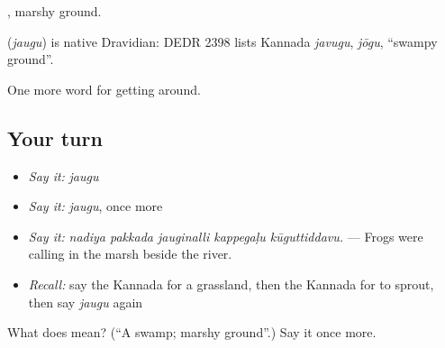  , marshy ground.

\begin{cousinweb}
\textbf{} (\emph{jaugu}) is native Dravidian: DEDR 2398 lists Kannada \emph{javugu}, \emph{jōgu}, \textquotedblleft{}swampy ground\textquotedblright{}.
\end{cousinweb}

\begin{grammarlens}[title={What you've built}]
One more word for getting around.
\end{grammarlens}

\subsection*{Your turn}
\begin{itemize}
\raggedright
  \item \emph{Say it:} \emph{jaugu}
  \item \emph{Say it:} \emph{jaugu}, once more
  \item \emph{Say it:} \emph{nadiya pakkada jauginalli kappegaḷu kūguttiddavu.} — Frogs were calling in the marsh beside the river.
  \item \emph{Recall:} say the Kannada for a grassland, then the Kannada for to sprout, then say \emph{jaugu} again
\end{itemize}

\begin{tcolorbox}[breakable,colback=teal!4,colframe=teal!35!black,title={Before you move on}]
What does  mean? (\textquotedblleft{}A swamp; marshy ground\textquotedblright{}.) Say it once more.
\end{tcolorbox}
